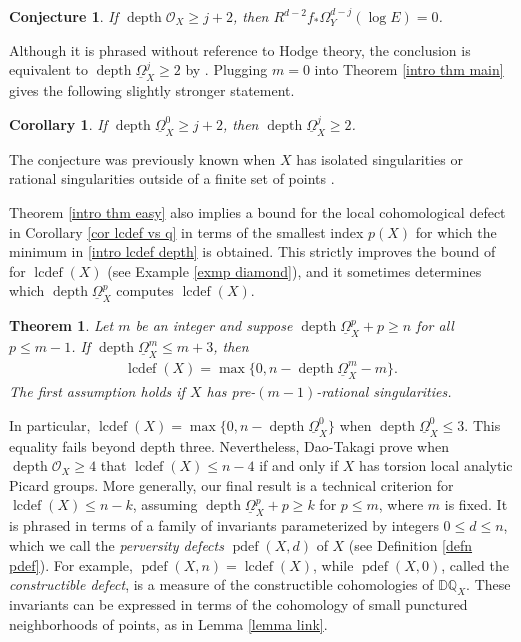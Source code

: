 \documentclass[11pt]{amsart}
\theoremstyle{definition}
\theoremstyle{plain}
\newcounter{intro}
\newtheorem{intro-conjecture}[intro]{Conjecture}
\newtheorem{intro-corollary}[intro]{Corollary}
\newtheorem{intro-theorem}[intro]{Theorem}
\DeclareMathOperator{\lcdef}{lcdef}
\DeclareMathOperator{\pdef}{pdef}
\DeclareMathOperator{\depth}{depth}
\begin{document}
\begin{intro-conjecture}\cite[Conjecture $14.1$]{local cohomology}\label{intro conj}
If $\depth \mathscr{O}_X  \geq j+2$, then $R^{d-2} f_* \Omega_Y^{d-j} ( \log E) = 0$.
\end{intro-conjecture}

Although it is phrased without reference to Hodge theory, the conclusion is equivalent to $\depth \underline{\Omega}_X^j \geq 2$ by \cite[Lemma $14.4$]{local cohomology}. Plugging $m = 0$ into Theorem \ref{intro thm main} gives the following slightly stronger statement.

\begin{intro-corollary}\label{intro cor answering conj}
If $\depth \underline{\Omega}_X^0 \geq j+2$, then $\depth \underline{\Omega}_X^j \geq 2$.
\end{intro-corollary}
The conjecture was previously known when $X$ has isolated singularities \cite[Theorem $14.3$]{local cohomology} or rational singularities outside of a finite set of points \cite[Theorem $0.7$]{weaklyratl}. 

Theorem \ref{intro thm easy} also implies a bound for the local cohomological defect in Corollary \ref{cor lcdef vs q} in terms of the smallest index $p(X)$ for which the minimum in \ref{intro lcdef depth} is obtained. This strictly improves the bound of \cite[Corollary $7.5$]{popa park lefschetz} for $\lcdef(X)$ (see Example \ref{exmp diamond}), and it sometimes determines which $\depth \underline{\Omega}_X^p$ computes $\lcdef(X)$.

\begin{intro-theorem}\label{intro dt thm}
Let $m$ be an integer and suppose $\depth \underline{\Omega}_X^p +p \geq n$ for all $p \leq m-1$. If $\depth \underline{\Omega}_X^m \leq m+3$, then
\begin{align*}
    \lcdef(X) = \max \{ 0, n-\depth \underline{\Omega}_X^m -m \}.
\end{align*}
The first assumption holds if $X$ has pre-$(m-1)$-rational singularities.
\end{intro-theorem}

In particular, $\lcdef(X) = \max \{ 0, n-\depth \underline{\Omega}_X^0 \}$ when $\depth \underline{\Omega}_X^0 \leq 3$. This equality fails beyond depth three. Nevertheless, Dao-Takagi \cite{dao takagi} prove when $\depth \mathscr{O}_X \geq 4$ that $\lcdef(X) \leq n-4$ if and only if $X$ has torsion local analytic Picard groups. More generally, our final result is a technical criterion for $\lcdef(X) \leq n-k$, assuming $\depth \underline{\Omega}_X^p + p \geq k$ for $p \leq m$, where $m$ is fixed. It is phrased in terms of a family of invariants parameterized by integers $0 \leq d \leq n$, which we call the \emph{perversity defects} $\pdef(X, d)$ of $X$ (see Definition \ref{defn pdef}). For example, $\pdef(X,n) = \lcdef(X)$, while $\pdef(X,0)$, called the \emph{constructible defect}, is a measure of the constructible cohomologies of $\mathbb{D} \mathbb{Q}_X$. These invariants can be expressed in terms of the cohomology of small punctured neighborhoods of points, as in Lemma \ref{lemma link}.
\end{document}
